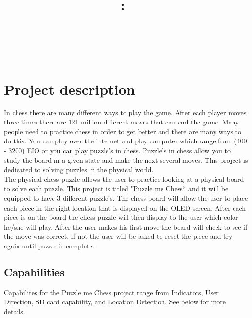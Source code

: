 \documentclass[11pt]{article}
\title{\vspace{2in}\textmd{\textbf{\hmwkClass:\ \hmwkTitle}}\\\normalsize\vspace{0.1in}\small{\hmwkDueDate}\\\vspace{0.1in}\large{\textit{\hmwkClassInstructor\ }}\vspace{3in}}
\date{}
\author{\textbf{\hmwkAuthorName}}
\begin{document}
\maketitle %
\newpage

\tableofcontents %


\clearpage 
\section{Project description}
In chess there are many different ways to play the game. After each player moves three times there are 121 million different moves that can end the game. Many people need to practice chess in order to get better and there are many ways to do this. You can play over the internet and play computer which range from (400 - 3200) EIO or you can play puzzle's in chess. Puzzle's in chess allow you to study the board in a given state and make the next several moves. This project is dedicated to solving puzzles in the physical world. 
\\

\noindent The physical chess puzzle allows the user to practice looking at a physical board to solve each puzzle. This project is titled "Puzzle me Chess`` and it will be equipped to have 3 different puzzle's. The chess board will allow the user to place each piece in the right location that is displayed on the OLED screen. After each piece is on the board the chess puzzle will then display to the user which color he/she will play. After the user makes his first move the board will check to see if the move was correct. If not the user will be asked to reset the piece and try again until puzzle is complete. 

\subsection{Capabilities}
Capabilites for the Puzzle me Chess project range from Indicators, User Direction, SD card capability, and Location Detection. See below for more details. 
\end{document}
